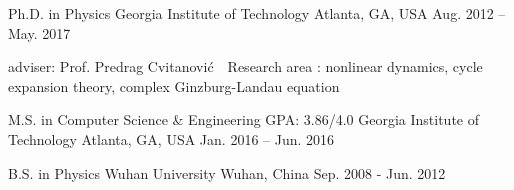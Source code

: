 


\begin{cventries}

\cveducation
{Ph.D. in Physics}
{Georgia Institute of Technology}
{Atlanta, GA, USA}
{Aug. 2012 -- May. 2017}
{
  \begin{cvitems}
    \item adviser: Prof. Predrag Cvitanovi\'c \quad \quad 
    \bullet \,\, Research area : nonlinear dynamics, cycle expansion theory,
      complex Ginzburg-Landau equation
  \end{cvitems}
}


\cvmaster
{M.S. in Computer Science \& Engineering }
{GPA: 3.86/4.0}
{Georgia Institute of Technology}
{Atlanta, GA, USA}
{Jan. 2016 -- Jun. 2016}

\cveducation
{B.S. in Physics} %
{Wuhan University} %
{Wuhan, China} %
{Sep. 2008 - Jun. 2012} %
{    
}
\vspace{-0.5em}



\end{cventries}
